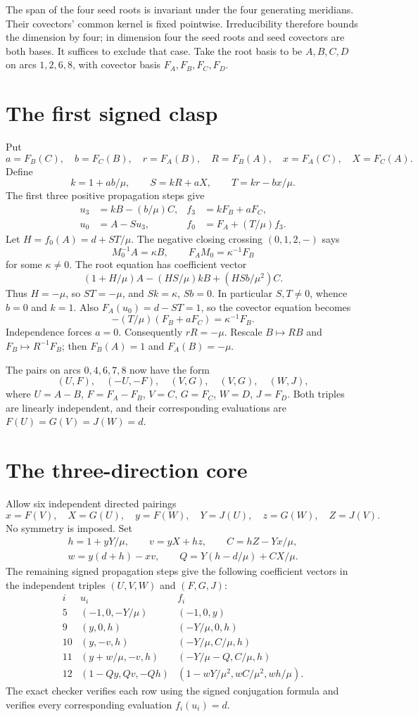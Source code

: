 \documentclass[11pt]{article}
\begin{document}
The span of the four seed roots is invariant under the four generating
meridians. Their covectors' common kernel is fixed pointwise.
Irreducibility therefore bounds the dimension by four; in dimension four
the seed roots and seed covectors are both bases. It suffices to exclude
that case. Take the root basis to be $A,B,C,D$ on arcs $1,2,6,8$, with
covector basis $F_A,F_B,F_C,F_D$.

\section*{The first signed clasp}
Put
\[
a=F_B(C),\quad b=F_C(B),\quad r=F_A(B),\quad R=F_B(A),
\quad x=F_A(C),\quad X=F_C(A).
\]
Define
\[
k=1+ab/\mu,\qquad S=kR+aX,\qquad T=kr-bx/\mu.
\]
The first three positive propagation steps give
\[
\begin{aligned}
u_3&=kB-(b/\mu)C,& f_3&=kF_B+aF_C,\\
u_0&=A-Su_3,&f_0&=F_A+(T/\mu)f_3.
\end{aligned}
\]
Let $H=f_0(A)=d+ST/\mu$. The negative closing crossing
$(0,1,2,-)$ says
\[
 M_0^{-1}A=\kappa B,\qquad F_AM_0=\kappa^{-1}F_B
\]
for some $\kappa\ne0$. The root equation has coefficient vector
\[
 (1+H/\mu)A-(HS/\mu)kB+(HSb/\mu^2)C.
\]
Thus $H=-\mu$, so $ST=-\mu$, and $Sk=\kappa$, $Sb=0$.
In particular $S,T\ne0$, whence $b=0$ and $k=1$.
Also $F_A(u_0)=d-ST=1$, so the covector equation becomes
\[
 -(T/\mu)(F_B+aF_C)=\kappa^{-1}F_B.
\]
Independence forces $a=0$. Consequently $rR=-\mu$.
Rescale $B\mapsto RB$ and $F_B\mapsto R^{-1}F_B$; then
$F_B(A)=1$ and $F_A(B)=-\mu$.

The pairs on arcs $0,4,6,7,8$ now have the form
\[
 (U,F),\quad(-U,-F),\quad(V,G),\quad(V,G),\quad(W,J),
\]
where $U=A-B$, $F=F_A-F_B$, $V=C$, $G=F_C$, $W=D$, $J=F_D$.
Both triples are linearly independent, and their corresponding
evaluations are $F(U)=G(V)=J(W)=d$.

\section*{The three-direction core}
Allow six independent directed pairings
\[
x=F(V),\quad X=G(U),\quad y=F(W),\quad Y=J(U),\quad
z=G(W),\quad Z=J(V).
\]
No symmetry is imposed. Set
\[
\begin{gathered}
h=1+yY/\mu,\qquad v=yX+hz,\qquad C=hZ-Yx/\mu,\\
w=y(d+h)-xv,\qquad Q=Y(h-d/\mu)+CX/\mu.
\end{gathered}
\]
The remaining signed propagation steps give the following coefficient
vectors in the independent triples $(U,V,W)$ and $(F,G,J)$:
\[
\begin{array}{c|c|c}
i&u_i&f_i\\\hline
5&(-1,0,-Y/\mu)&(-1,0,y)\\
9&(y,0,h)&(-Y/\mu,0,h)\\
10&(y,-v,h)&(-Y/\mu,C/\mu,h)\\
11&(y+w/\mu,-v,h)&(-Y/\mu-Q,C/\mu,h)\\
12&(1-Qy,Qv,-Qh)&(1-wY/\mu^2,wC/\mu^2,wh/\mu).
\end{array}
\]
The exact checker verifies each row using the signed conjugation formula
and verifies every corresponding evaluation $f_i(u_i)=d$.
\end{document}
